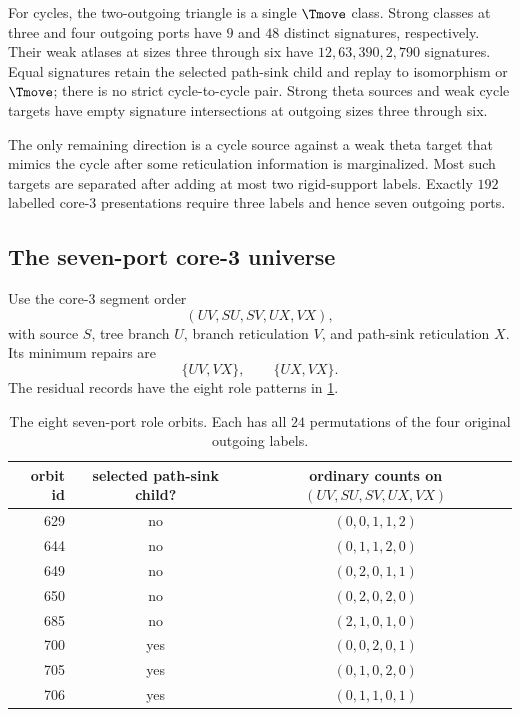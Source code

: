 For cycles, the two-outgoing triangle is a single $\Tmove$ class.  Strong classes at three and four outgoing ports have $9$ and $48$ distinct signatures, respectively.  Their weak atlases at sizes three through six have $12,63,390,2{,}790$ signatures.  Equal signatures retain the selected path-sink child and replay to isomorphism or $\Tmove$; there is no strict cycle-to-cycle pair.  Strong theta sources and weak cycle targets have empty signature intersections at outgoing sizes three through six.

The only remaining direction is a cycle source against a weak theta target that mimics the cycle after some reticulation information is marginalized.  Most such targets are separated after adding at most two rigid-support labels.  Exactly $192$ labelled core-3 presentations require three labels and hence seven outgoing ports.

\subsection{The seven-port core-3 universe}\label{sec:seven-port}

Use the core-3 segment order
\[
(UV,SU,SV,UX,VX),
\]
with source $S$, tree branch $U$, branch reticulation $V$, and path-sink reticulation $X$.  Its minimum repairs are
\[
\{UV,VX\},\qquad \{UX,VX\}.
\]
The residual records have the eight role patterns in \cref{tab:seven-orbits}.

\begin{table}[t]
\centering
\caption{The eight seven-port role orbits.  Each has all $24$ permutations of the four original outgoing labels.}
\label{tab:seven-orbits}
\begin{tabular}{@{}rcc@{}}
\toprule
orbit id & selected path-sink child? & ordinary counts on $(UV,SU,SV,UX,VX)$\\
\midrule
629 & no  & $(0,0,1,1,2)$\\
644 & no  & $(0,1,1,2,0)$\\
649 & no  & $(0,2,0,1,1)$\\
650 & no  & $(0,2,0,2,0)$\\
685 & no  & $(2,1,0,1,0)$\\
700 & yes & $(0,0,2,0,1)$\\
705 & yes & $(0,1,0,2,0)$\\
706 & yes & $(0,1,1,0,1)$\\
\bottomrule
\end{tabular}
\end{table}

